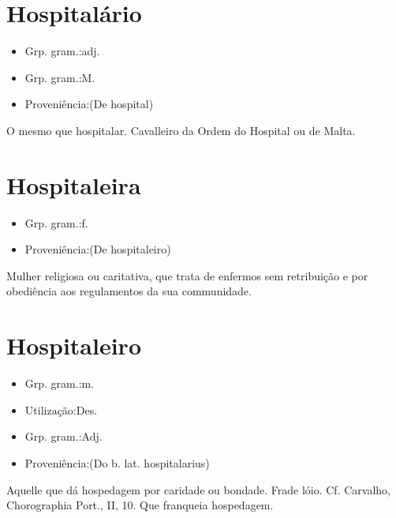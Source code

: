 \documentclass{article}
\begin{document}
\section{Hospitalário}
\begin{itemize}
\item {Grp. gram.:adj.}
\end{itemize}
\begin{itemize}
\item {Grp. gram.:M.}
\end{itemize}
\begin{itemize}
\item {Proveniência:(De \textunderscore hospital\textunderscore )}
\end{itemize}
O mesmo que \textunderscore hospitalar\textunderscore .
Cavalleiro da Ordem do Hospital ou de Malta.
\section{Hospitaleira}
\begin{itemize}
\item {Grp. gram.:f.}
\end{itemize}
\begin{itemize}
\item {Proveniência:(De \textunderscore hospitaleiro\textunderscore )}
\end{itemize}
Mulher religiosa ou caritativa, que trata de enfermos sem retribuição e por obediência aos regulamentos da sua communidade.
\section{Hospitaleiro}
\begin{itemize}
\item {Grp. gram.:m.}
\end{itemize}
\begin{itemize}
\item {Utilização:Des.}
\end{itemize}
\begin{itemize}
\item {Grp. gram.:Adj.}
\end{itemize}
\begin{itemize}
\item {Proveniência:(Do b. lat. \textunderscore hospitalarius\textunderscore )}
\end{itemize}
Aquelle que dá hospedagem por caridade ou bondade.
Frade lóio. Cf. Carvalho, \textunderscore Chorographia Port.\textunderscore , II, 10.
Que franqueia hospedagem.
\end{document}
